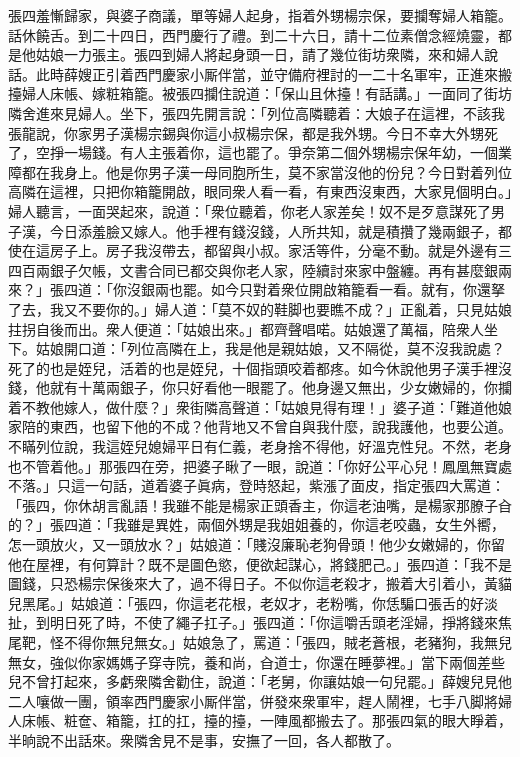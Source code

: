 張四羞慚歸家，與婆子商議，{}單等婦人起身，指着外甥楊宗保，要攔奪婦人箱籠。話休饒舌。到二十四日，西門慶行了禮。到二十六日，請十二位素僧念經燒靈，都是他姑娘一力張主。張四到婦人將起身頭一日，請了幾位街坊衆隣，來和婦人說話。此時薛嫂正引着西門慶家小厮伴當，並守備府裡討的一二十名軍牢，正進來搬擡婦人床帳、嫁粧箱籠。被張四攔住說道：「保山且休擡！有話講。」一面同了街坊隣舍進來見婦人。坐下，張四先開言說：「列位高隣聽着：大娘子在這裡，不該我張龍說，{}你家男子漢楊宗錫與你這小叔楊宗保，都是我外甥。今日不幸大外甥死了，空掙一場錢。有人主張着你，{}這也罷了。爭奈第二個外甥楊宗保年幼，一個業障都在我身上。他是你男子漢一母同胞所生，莫不家當沒他的份兒？今日對着列位高隣在這裡，只把你箱籠開啟，眼同衆人看一看，有東西沒東西，大家見個明白。」婦人聽言，一面哭起來，說道：「衆位聽着，你老人家差矣！奴不是歹意謀死了男子漢，今日添羞臉又嫁人。他手裡有錢沒錢，人所共知，就是積攢了幾兩銀子，都使在這房子上。{}房子我沒帶去，都留與小叔。家活等件，分毫不動。就是外邊有三四百兩銀子欠帳，文書合同已都交與你老人家，陸續討來家中盤纏。再有甚麼銀兩來？」張四道：「你沒銀兩也罷。如今只對着衆位開啟箱籠看一看。就有，你還拏了去，我又不要你的。」婦人道：「莫不奴的鞋脚也要瞧不成？」正亂着，只見姑娘拄拐自後而出。{}衆人便道：「姑娘出來。」都齊聲唱喏。姑娘還了萬福，陪衆人坐下。姑娘開口道：「列位高隣在上，我是他是親姑娘，又不隔從，莫不沒我說處？死了的也是姪兒，活着的也是姪兒，十個指頭咬着都疼。如今休說他男子漢手裡沒錢，他就有十萬兩銀子，你只好看他一眼罷了。他身邊又無出，少女嫩婦的，你攔着不教他嫁人，做什麼？」衆街隣高聲道：「姑娘見得有理！」婆子道：「難道他娘家陪的東西，也留下他的不成？他背地又不曾自與我什麼，{}說我護他，也要公道。不瞞列位說，我這姪兒媳婦平日有仁義，老身捨不得他，好溫克性兒。不然，老身也不管着他。」那張四在旁，把婆子瞅了一眼，{}說道：「你好公平心兒！鳳凰無寶處不落。」只這一句話，道着婆子眞病，登時怒起，紫漲了面皮，指定張四大罵道：「張四，你休胡言亂語！我雖不能是楊家正頭香主，你這老油嘴，是楊家那膫子㒲的？」{}張四道：「我雖是異姓，兩個外甥是我姐姐養的，你這老咬蟲，女生外嚮，怎一頭放火，又一頭放水？」姑娘道：「賤沒廉恥老狗骨頭！他少女嫩婦的，你留他在屋裡，有何算計？既不是圖色慾，便欲起謀心，將錢肥己。」張四道：「我不是圖錢，只恐楊宗保後來大了，過不得日子。不似你這老殺才，搬着大引着小，黃貓兒黑尾。」姑娘道：「張四，你這老花根，老奴才，老粉嘴，你恁騙口張舌的好淡扯，到明日死了時，不使了繩子扛子。」張四道：「你這嚼舌頭老淫婦，掙將錢來焦尾靶，怪不得你無兒無女。」姑娘急了，罵道：「張四，賊老蒼根，老豬狗，我無兒無女，強似你家媽媽子穿寺院，養和尚，㒲道士，你還在睡夢裡。」當下兩個差些兒不曾打起來，多虧衆隣舍勸住，說道：「老舅，你讓姑娘一句兒罷。」薛嫂兒見他二人嚷做一團，領率西門慶家小厮伴當，併發來衆軍牢，趕人鬧裡，七手八脚將婦人床帳、粧奩、箱籠，扛的扛，擡的擡，一陣風都搬去了。{}那張四氣的眼大睜着，半晌說不出話來。衆隣舍見不是事，安撫了一回，各人都散了。

